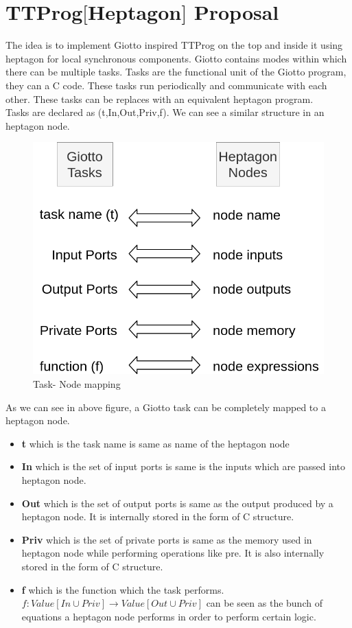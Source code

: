 \documentclass[16pt]{report}
\begin{document}
\section{TTProg${[}$Heptagon${]} $ Proposal}
The idea is to implement Giotto inspired TTProg on the top and inside it using heptagon for local synchronous components. Giotto contains modes within which there can be multiple tasks. Tasks are the functional unit of the Giotto program, they can a C code. These tasks run periodically and communicate with each other. These tasks can be replaces with an equivalent heptagon program. \\
Tasks are declared as (t,In,Out,Priv,f). We can see a similar structure in an heptagon node. 

\begin{figure}[H]
\centering
\includegraphics[width=0.9\linewidth]{fig12.png}
\caption{Task- Node mapping}
\end{figure}

As we can see in above figure, a Giotto task can be completely mapped to a heptagon node.
\begin{itemize}
   \item \textbf{t} which is the task name is same as name of the heptagon node
    \item \textbf{In} which is the set of input ports is same is the inputs which are passed into heptagon node.
    \item \textbf{Out} which is the set of output ports is same as the output produced by a heptagon node. It is internally stored in the form of C structure.
    \item \textbf{Priv} which is the set of private ports is same as the memory used in heptagon node while performing operations like pre. It is also internally stored in the form of C structure.
    \item \textbf{f} which is the function which the task performs. $f: Value[In \cup Priv] \rightarrow  Value[Out \cup Priv]$ can be seen as the bunch of equations a heptagon node performs in order to perform certain logic.
\end{itemize}{}
\end{document}
